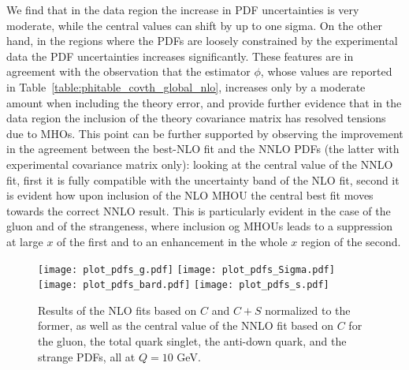     We find that in the data region the increase in PDF uncertainties is very moderate, while the central values 
    can shift by up to one sigma. On the other hand, in the regions where the PDFs are loosely constrained by the experimental
    data the PDF uncertainties increases significantly.
    These features are in agreement with the observation that the estimator $\phi$, whose values are reported 
    in Table~\ref{table:phitable_covth_global_nlo}, increases only by a moderate amount when including the theory error,
    and provide further evidence that in the data region the inclusion of the theory covariance matrix has resolved tensions
    due to MHOs.
    This point can be further supported by observing the improvement in the agreement between the best-NLO fit and the NNLO PDFs
    (the latter with experimental covariance matrix only): looking at the central value of the NNLO fit, 
    first it is fully compatible with the uncertainty band of the NLO fit, second it is evident how upon inclusion of 
    the NLO MHOU the central best fit moves towards the correct NNLO result.
    This is particularly evident in the case of the gluon and of the strangeness, where inclusion og MHOUs leads to a
    suppression at large $x$ of the first and to an enhancement in the whole $x$ region of the second.  
    \begin{figure}[t!]
        \begin{center}
            \texttt{[image: plot\_pdfs\_g.pdf]}
            \texttt{[image: plot\_pdfs\_Sigma.pdf]}
            \texttt{[image: plot\_pdfs\_bard.pdf]}
            \texttt{[image: plot\_pdfs\_s.pdf]}
            \caption{Results of the NLO fits based on $C$ and $C + S$ normalized to the
            former, as well as the central value of the NNLO fit based on $C$ for the gluon, the total quark singlet, 
            the anti-down quark, and the strange PDFs, all at $Q = 10$ GeV.} 
            \label{fig:pdfs_plots_th_err} 
        \end{center}
    \end{figure}

